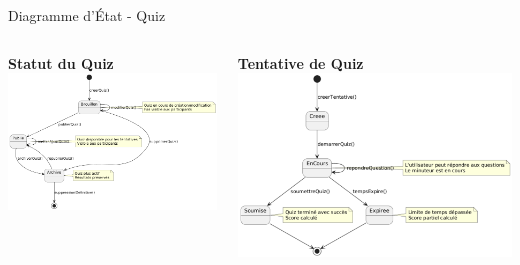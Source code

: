 \documentclass[aspectratio=169]{beamer}
\begin{document}
\begin{frame}{Diagramme d'État - Quiz}
    \begin{columns}
        \begin{center}
            \textbf{Statut du Quiz}\\[0.5cm]
            \includegraphics[width=\textwidth]{latex_media/media/Diagrammedetat-StatutduQuiz.png}
        \end{center}

        \begin{center}
            \textbf{Tentative de Quiz}\\[0.5cm]
            \includegraphics[width=\textwidth]{latex_media/media/Diagrammedetat-Tentative de Quiz.png}
        \end{center}
    \end{columns}
\end{frame}
\end{document}
